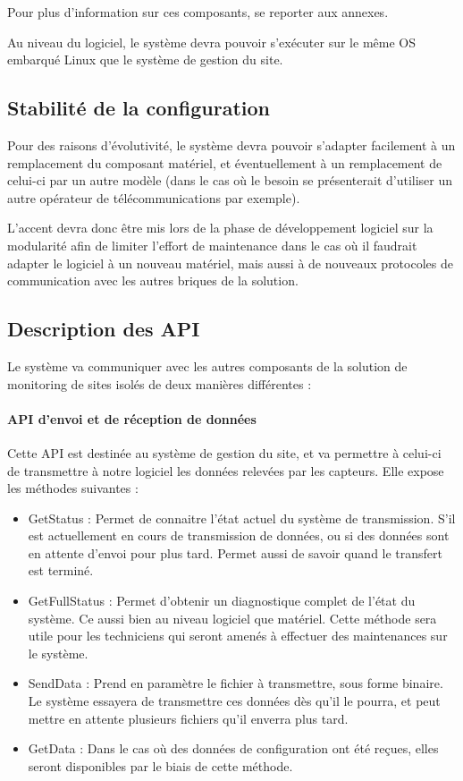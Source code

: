 Pour plus d'information sur ces composants, se reporter aux annexes.

Au niveau du logiciel, le système devra pouvoir s'exécuter sur le même OS embarqué Linux que le système de gestion du site.

\subsection{Stabilité de la configuration}

Pour des raisons d'évolutivité, le système devra pouvoir s'adapter facilement à un remplacement du composant matériel, et éventuellement à un remplacement de celui-ci par un autre modèle (dans le cas où le besoin se présenterait d'utiliser un autre opérateur de télécommunications par exemple).

L'accent devra donc être mis lors de la phase de développement logiciel sur la modularité afin de limiter l'effort de maintenance dans le cas où il faudrait adapter le logiciel à un nouveau matériel, mais aussi à de nouveaux protocoles de communication avec les autres briques de la solution.

\subsection{Description des API}

Le système va communiquer avec les autres composants de la solution de monitoring de sites isolés de deux manières différentes :

\paragraph{API d'envoi et de réception de données}

Cette API est destinée au système de gestion du site, et va permettre à celui-ci de transmettre à notre logiciel les données relevées par les capteurs. Elle expose les méthodes suivantes :

\begin{itemize}
\item GetStatus : Permet de connaitre l'état actuel du système de transmission. S'il est actuellement en cours de transmission de données, ou si des données sont en attente d'envoi pour plus tard. Permet aussi de savoir quand le transfert est terminé.
\item GetFullStatus : Permet d'obtenir un diagnostique complet de l'état du système. Ce aussi bien au niveau logiciel que matériel. Cette méthode sera utile pour les techniciens qui seront amenés à effectuer des maintenances sur le système.
\item SendData : Prend en paramètre le fichier à transmettre, sous forme binaire. Le système essayera de transmettre ces données dès qu'il le pourra, et peut mettre en attente plusieurs fichiers qu'il enverra plus tard.
\item GetData : Dans le cas où des données de configuration ont été reçues, elles seront disponibles par le biais de cette méthode.
\end{itemize}

